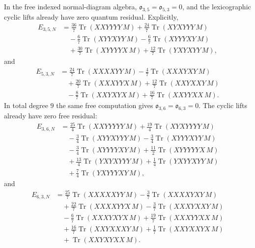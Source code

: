\begin{prop}
\label{prop:app-free-residual-vanishings}
  In the free indexed normal-diagram algebra,
  \(\mathfrak o_{3,5}=\mathfrak o_{5,3}=0\), and the lexicographic
  cyclic lifts already have zero quantum residual.  Explicitly,
  \[
  \begin{aligned}
    E_{3,5,N}
    &=
      \frac{36}{7}\operatorname{Tr}(XXYYYY\,M)
      +\frac{24}{7}\operatorname{Tr}(XYXYYY\,M)\\
    &\quad
      -\frac{6}{7}\operatorname{Tr}(XYYXYY\,M)
      -\frac{6}{7}\operatorname{Tr}(XYYYXY\,M)\\
    &\quad
      +\frac{30}{7}\operatorname{Tr}(XYYYYX\,M)
      +\frac{12}{7}\operatorname{Tr}(YXYXYY\,M),
  \end{aligned}
  \]
  and
  \[
  \begin{aligned}
    E_{5,3,N}
    &=
      \frac{24}{7}\operatorname{Tr}(XXXXYY\,M)
      -\frac{4}{7}\operatorname{Tr}(XXXYXY\,M)\\
    &\quad
      +\frac{20}{7}\operatorname{Tr}(XXXYYX\,M)
      +\frac{12}{7}\operatorname{Tr}(XXYXXY\,M)\\
    &\quad
      -\frac{8}{7}\operatorname{Tr}(XXYXYX\,M)
      +\frac{16}{7}\operatorname{Tr}(XXYYXX\,M).
  \end{aligned}
  \]
  In total degree \(9\) the same free computation gives
  \(\mathfrak o_{3,6}=\mathfrak o_{6,3}=0\).  The cyclic lifts already
  have zero free residual:
  \[
  \begin{aligned}
    E_{3,6,N}
    &=
      \frac{25}{4}\operatorname{Tr}(XXYYYYY\,M)
      +\frac{19}{4}\operatorname{Tr}(XYXYYYY\,M)\\
    &\quad
      -\frac{3}{4}\operatorname{Tr}(XYYXYYY\,M)
      -\frac{3}{4}\operatorname{Tr}(XYYYXYY\,M)\\
    &\quad
      -\frac{3}{4}\operatorname{Tr}(XYYYYXY\,M)
      +\frac{11}{2}\operatorname{Tr}(XYYYYYX\,M)\\
    &\quad
      +\frac{13}{4}\operatorname{Tr}(YXYXYYY\,M)
      +\frac{1}{4}\operatorname{Tr}(YXYYXYY\,M)\\
    &\quad
      +\frac{7}{4}\operatorname{Tr}(YXYYYXY\,M),
  \end{aligned}
  \]
  and
  \[
  \begin{aligned}
    E_{6,3,N}
    &=
      \frac{25}{7}\operatorname{Tr}(XXXXXYY\,M)
      -\frac{3}{7}\operatorname{Tr}(XXXXYXY\,M)\\
    &\quad
      +\frac{22}{7}\operatorname{Tr}(XXXXYYX\,M)
      -\frac{3}{7}\operatorname{Tr}(XXXYXXY\,M)\\
    &\quad
      -\frac{6}{7}\operatorname{Tr}(XXXYXYX\,M)
      +\frac{19}{7}\operatorname{Tr}(XXXYYXX\,M)\\
    &\quad
      +\frac{16}{7}\operatorname{Tr}(XXYXXXY\,M)
      +\frac{1}{7}\operatorname{Tr}(XXYXXYX\,M)\\
    &\quad
      +\operatorname{Tr}(XXYXYXX\,M).
  \end{aligned}
  \]
\end{prop}

